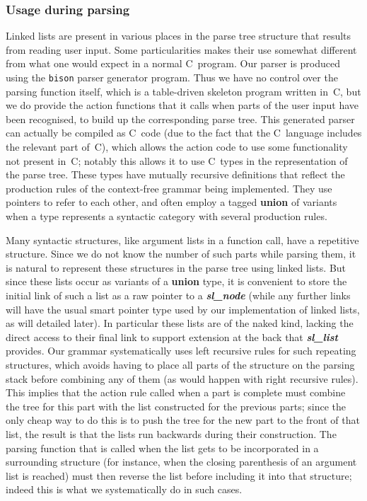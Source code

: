 \documentclass[12pt]{article}
\theoremstyle{plain}
\theoremstyle{definition}
\def\PP{\copy\PPbox}
\newcommand\Cee{\textsc{C}}
\newcommand\Cpp{\Cee\PP}
\def\slnd.{\textbf{\textit{sl\_\!node}}}
\def\slls.{\textbf{\textit{sl\_\!list}}}
\begin{document}
\subsubsection{Usage during parsing}

Linked lists are present in various places in the parse tree structure that
results from reading user input. Some particularities makes their use somewhat
different from what one would expect in a normal \Cpp\ program. Our parser is
produced using the \texttt{bison} parser generator program. Thus we have no
control over the parsing function itself, which is a table-driven skeleton
program written in~\Cee, but we do provide the action functions that it calls
when parts of the user input have been recognised, to build up the corresponding
parse tree. This generated parser can actually be compiled as \Cpp~code (due to
the fact that the \Cpp\ language includes the relevant part of~\Cee), which
allows the action code to use some functionality not present in~\Cee; notably
this allows it to use \Cpp\ types in the representation of the parse tree. These
types have mutually recursive definitions that reflect the production rules of
the context-free grammar being implemented. They use pointers to refer to each
other, and often employ a tagged \textbf{union} of variants when a type
represents a syntactic category with several production rules.

Many syntactic structures, like argument lists in a function call, have a
repetitive structure. Since we do not know the number of such parts while
parsing them, it is natural to represent these structures in the parse tree
using linked lists. But since these lists occur as variants of a \textbf{union}
type, it is convenient to store the initial link of such a list as a raw pointer
to a \slnd. (while any further links will have the usual smart pointer type used
by our implementation of linked lists, as will detailed later). In particular
these lists are of the naked kind, lacking the direct access to their final link
to support extension at the back that \slls. provides. Our grammar
systematically uses left recursive rules for such repeating structures, which
avoids having to place all parts of the structure on the parsing stack before
combining any of them (as would happen with right recursive rules). This implies
that the action rule called when a part is complete must combine the tree for
this part with the list constructed for the previous parts; since the only cheap
way to do this is to push the tree for the new part to the front of that list,
the result is that the lists run backwards during their construction. The
parsing function that is called when the list gets to be incorporated in a
surrounding structure (for instance, when the closing parenthesis of an argument
list is reached) must then reverse the list before including it into that
structure; indeed this is what we systematically do in such cases.
\end{document}
